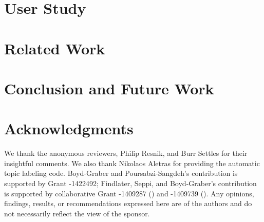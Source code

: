 \documentclass[11pt]{article}
\begin{document}
\section{User Study}
\label{sec:user_exp_results}

\section{Related Work}
\label{sec:related_work}

\section{Conclusion and Future Work}
\label{sec:conclusion}

\clearpage

\section*{Acknowledgments}
We thank the anonymous reviewers, Philip Resnik, and Burr Settles for
their insightful comments. We also thank Nikolaos Aletras for
providing the automatic topic labeling code.  Boyd-Graber and
Poursabzi-Sangdeh's contribution is supported by  Grant
-1422492; Findlater, Seppi, and Boyd-Graber's contribution
is supported by collaborative  Grant -1409287
() and -1409739 ().  Any opinions,
findings, results, or recommendations expressed here are of the
authors and do not necessarily reflect the view of the sponsor.



\end{document}
